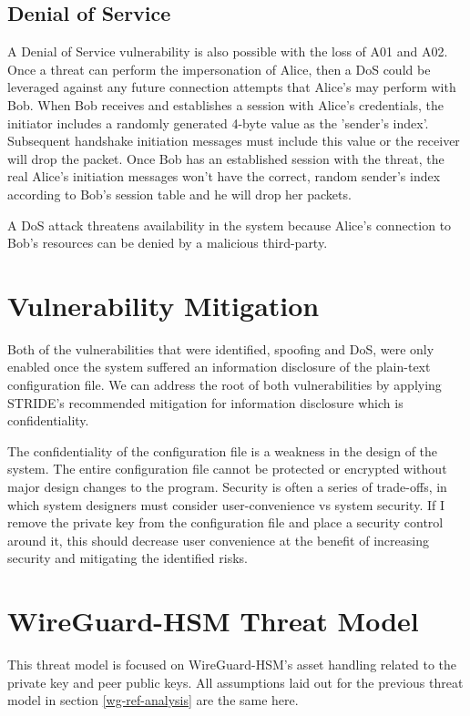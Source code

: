 \documentclass [11pt, proquest] {uwthesis}[2020/02/24]
\begin{document}
\subsection{Denial of Service}
\label{dos}
A Denial of Service vulnerability is also possible with the loss of A01 and A02. Once a threat can perform the impersonation of Alice, then a DoS could be leveraged against any future connection attempts that Alice's may perform with Bob. When Bob receives and establishes a session with Alice's credentials, the initiator includes a randomly generated 4-byte value as the 'sender's index'. Subsequent handshake initiation messages must include this value or the receiver will drop the packet. Once Bob has an established session with the threat, the real Alice's initiation messages won't have the correct, random sender's index according to Bob's session table and he will drop her packets.

A DoS attack threatens availability in the system because Alice's connection to Bob's resources can be denied by a malicious third-party.

\section{Vulnerability Mitigation}
Both of the vulnerabilities that were identified, spoofing and DoS, were only enabled once the system suffered an information disclosure of the plain-text configuration file. We can address the root of both vulnerabilities by applying STRIDE's recommended mitigation for information disclosure which is confidentiality.

The confidentiality of the configuration file is a weakness in the design of the system. The entire configuration file cannot be protected or encrypted without major design changes to the program.
Security is often a series of trade-offs, in which system designers must consider user-convenience vs system security. If I remove the private key from the configuration file and place a security control around it, this should decrease user convenience at the benefit of increasing security and mitigating the identified risks.

\section{WireGuard-HSM Threat Model}
\label{wg-hsm-analysis}
This threat model is focused on WireGuard-HSM's asset handling related to the private key and peer public keys. All assumptions laid out for the previous threat model in section \ref{wg-ref-analysis} are the same here.
\end{document}
